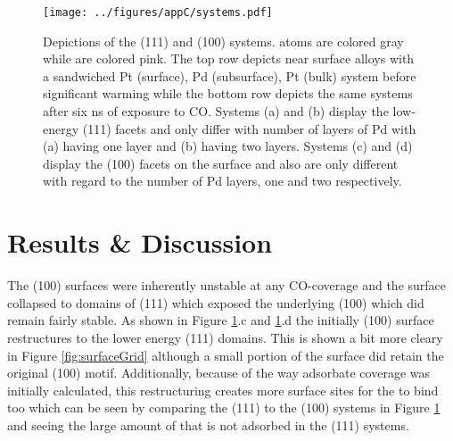 \begin{landscape}
\begin{figure}[p!]
\centering
  \texttt{[image: ../figures/appC/systems.pdf]}
  \caption{Depictions of the (111) and (100) systems.  atoms are colored
gray while  are colored pink. The top row depicts near surface alloys
with a sandwiched Pt (surface), Pd (subsurface), Pt (bulk) system before
significant warming while the bottom row depicts the same systems after six ns of
exposure to CO. Systems (a) and (b) display the low-energy (111) facets and
only differ with number of layers of Pd with (a) having one layer and (b)
having two layers. Systems (c) and (d) display the (100) facets on the surface
and also are only different with regard to the number of Pd layers, one and two
respectively.}
\label{fig:biSystems}
\end{figure}
\end{landscape}

\section{Results \& Discussion}
The (100) surfaces were inherently unstable at any CO-coverage and the surface
 collapsed to domains of (111) which exposed the underlying (100)
 which did remain fairly stable. As shown in Figure
\ref{fig:biSystems}.c and \ref{fig:biSystems}.d the initially (100) surface
restructures to the lower energy (111) domains. This is shown a bit more cleary
in Figure \ref{fig:surfaceGrid} although a small portion of the surface did
retain the original (100) motif. Additionally, because of the way adsorbate
coverage was initially calculated, this restructuring creates more surface
sites for the  to bind too which can be seen by comparing the (111) to
the (100) systems in Figure \ref{fig:biSystems} and seeing the large amount of
 that is not adsorbed in the (111) systems.

